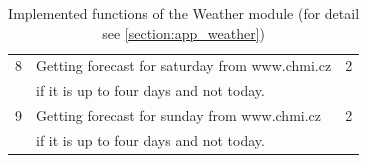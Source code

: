 \begin{table}[H]
{\begin{tabular}{|l|l|l|}
        \multicolumn{1}{|c|}{8} & \multicolumn{1}{l|}{Getting forecast for saturday from www.chmi.cz} & \multicolumn{1}{c|}{2} \\ 
        \multicolumn{1}{|c|}{} & \multicolumn{1}{l|}{if it is up to four days and not today.}                                           & \multicolumn{1}{c|}{} \\ \hline
        \multicolumn{1}{|c|}{9} & \multicolumn{1}{l|}{Getting forecast for sunday from www.chmi.cz}   & \multicolumn{1}{c|}{2} \\ 
        \multicolumn{1}{|c|}{} & \multicolumn{1}{l|}{if it is up to four days and not today.}                                           & \multicolumn{1}{c|}{} \\ \hline
    \end{tabular}}
    \caption{Implemented functions of the Weather module (for detail see \cref{section:app_weather})} 
    \label{tab:weather_command_voice}
\end{table} 
